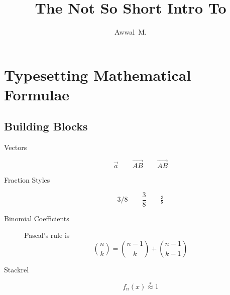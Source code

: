 \documentclass[12pt]{article}
\begin{document}
\title{The Not So Short Intro To \LaTeXe{}}
\author{Awwal~M.}
\maketitle

\section{Typesetting Mathematical Formulae}\label{sec:typesetting-math{}}

\subsection{Building Blocks}\label{subsec:building-blocks}
    \begin{description}
        \item[Vectors] \qquad
        \begin{equation*}
            \vec{a} \qquad
            \vec{AB} \qquad
            \overrightarrow{AB}
        \end{equation*}
    \end{description}

    \begin{description}
    \item[Fraction Styles] \qquad
        \begin{equation*}
            3/8 \qquad
            \frac{3}{8} \qquad
            \tfrac{3}{8}
        \end{equation*}
    \end{description}

    \begin{description}
        \item [Binomial Coefficients] \qquad Pascal's rule is
        \begin{equation*}
            \binom{n}{k} = \binom{n-1}{k} + \binom{n-1}{k-1}
        \end{equation*}
    \end{description}

    \begin{description}
        \item [Stackrel]
        \begin{equation*}
            f_n(x) \stackrel{*}{\approx} 1
        \end{equation*}
    \end{description}
\end{document}
